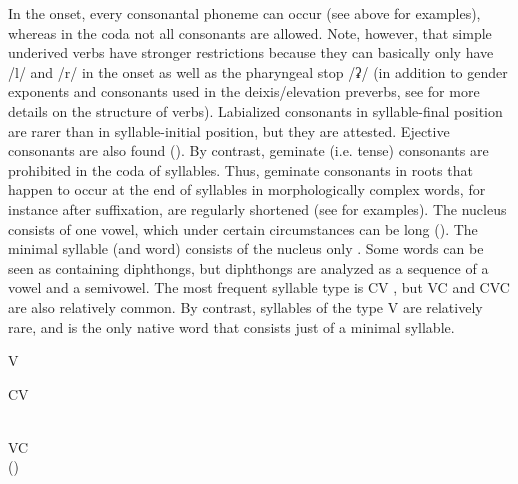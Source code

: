 In the onset, every consonantal phoneme can occur (see  above for examples), whereas in the coda not all consonants are allowed. Note, however, that simple underived verbs have stronger restrictions because they can basically only have /l/ and /r/ in the onset as well as the pharyngeal stop /ʡ/ (in addition to gender exponents and consonants used in the deixis/elevation preverbs, see  for more details on the structure of verbs). Labialized consonants in syllable-final position are rarer than in syllable-initial position, but they are attested. Ejective consonants are also found (). By contrast, geminate (i.e. tense) consonants are prohibited in the coda of syllables. Thus, geminate consonants in roots that happen to occur at the end of syllables in morphologically complex words, for instance after suffixation, are regularly shortened (see  for examples). The nucleus consists of one vowel, which under certain circumstances can be long (). The minimal syllable (and word) consists of the nucleus only . Some words can be seen as containing diphthongs, but diphthongs are analyzed as a sequence of a vowel and a semivowel. The most frequent syllable type is CV , but VC  and CVC  are also relatively common. By contrast, syllables of the type V are relatively rare, and   is the only native word that consists just of a minimal syllable.
%
\begin{exe}
\TabPositions{11em}
	\ex	V	\label{ex:syllable V phon} \\
		 	 \tab {} 	
\end{exe}	

\begin{exe}
\TabPositions{11em}
	\ex	CV	\label{ex:syllable CV phon} \\
		 	\tab {} 	\\
		  	\tab{} 		
		 	\tab {} 	
\end{exe}	

\begin{exe}
\TabPositions{11em}
	\ex	VC	\label{ex:syllable VC phon} \\
		 	() \tab {} 	
\end{exe}

